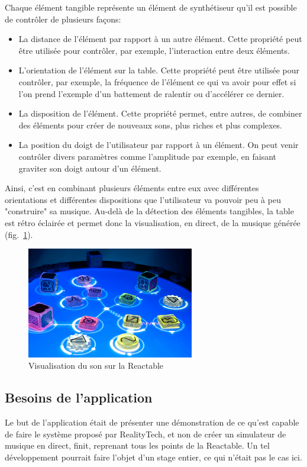 Chaque élément tangible représente un élément de synthétiseur qu'il est possible de contrôler de plusieurs façons:
\begin{itemize} 
\item La distance de l'élément par rapport à un autre élément. Cette propriété peut être utilisée pour contrôler, par exemple, l'interaction entre deux éléments.
\item L'orientation de l'élément sur la table. Cette propriété peut être utilisée pour contrôler, par exemple, la fréquence de l'élément ce qui va avoir pour effet si l'on prend l'exemple d'un battement de ralentir ou d'accélérer ce dernier.
\item La disposition de l'élément. Cette propriété permet, entre autres, de combiner des éléments pour créer de nouveaux sons, plus riches et plus complexes.
\item La position du doigt de l'utilisateur par rapport à un élément. On peut venir contrôler divers paramètres comme l'amplitude par exemple, en faisant graviter son doigt autour d'un élément.
\end{itemize}
Ainsi, c'est en combinant plusieurs éléments entre eux avec différentes orientations et différentes dispositions que l'utilisateur va pouvoir peu à peu "construire" sa musique.
Au-delà de la détection des éléments tangibles, la table est rétro éclairée et permet donc la visualisation, en direct, de la musique générée (fig.~\ref{fig:reactivsu}).

\begin{figure}[H]
\centering
\includegraphics[width=0.65\textwidth]{images/reactvisu}
\caption{Visualisation du son sur la Reactable\protect\footnotemark}
\label{fig:reactivsu}
\end{figure}


\subsection{Besoins de l'application}
\label{subsec:reartable:content}
Le but de l'application était de présenter une démonstration de ce qu'est capable de faire le système proposé par RealityTech, et non de créer un simulateur de musique en direct, finit, reprenant tous les points de la Reactable. Un tel développement pourrait faire l'objet d'un stage entier, ce qui n'était pas le cas ici.

